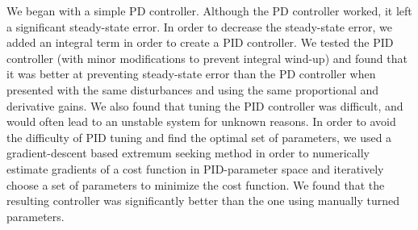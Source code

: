 \documentclass{article}
\begin{document}
We began with a simple PD controller. Although the PD controller worked, it left a significant
steady-state error. In order to decrease the steady-state error, we added an integral term in order
to create a PID controller. We tested the PID controller (with minor modifications to prevent
integral wind-up) and found that it was better at preventing steady-state error than the PD
controller when presented with the same disturbances and using the same proportional and derivative
gains. We also found that tuning the PID controller was difficult, and would often lead to an
unstable system for unknown reasons. In order to avoid the difficulty of PID tuning and find the
optimal set of parameters, we used a gradient-descent based extremum seeking method in order to
numerically estimate gradients of a cost function in PID-parameter space and iteratively choose a
set of parameters to minimize the cost function. We found that the resulting controller was
significantly better than the one using manually turned parameters.
\end{document}
